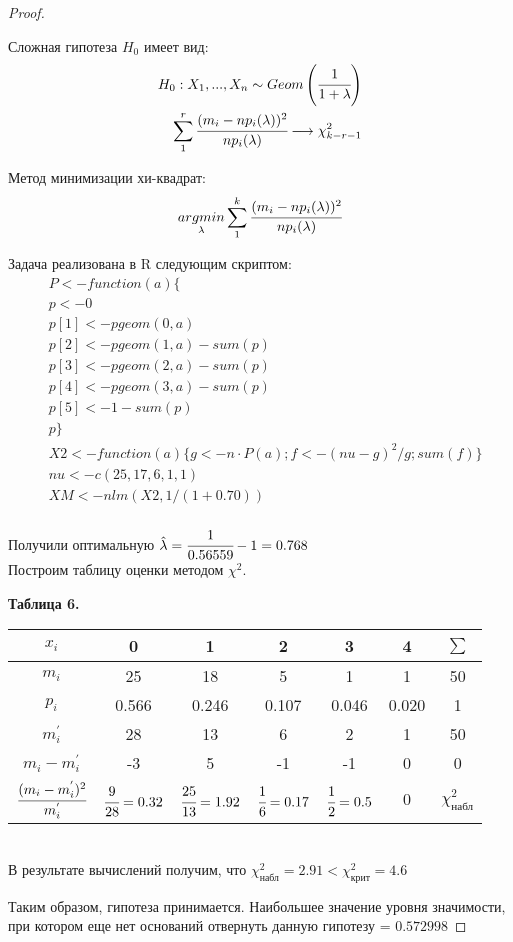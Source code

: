 \begin{proof}
	$ $
	
	Сложная гипотеза $H_0$ имеет вид:
	\begin{align}
		H_0: X_1, ..., X_n \sim Geom\left(\cfrac{1}{1+\lambda}\right) \\
		\sum\limits_1^r\cfrac{(m_i-np_i(\lambda))^2}{np_i(\lambda)}\longrightarrow\chi^2_{k-r-1}
	\end{align}	
	
	Метод минимизации хи-квадрат:
	\begin{equation}
		\underset{\lambda}{argmin}\sum\limits_1^k\cfrac{(m_i-np_i(\lambda))^2}{np_i(\lambda)}
	\end{equation}
	
	Задача реализована в R следующим скриптом:
	\begin{align}
		&P <- function(a)\{ \\
		&p <- 0\\
		&p[1] <- pgeom(0, a)\\
		&p[2] <- pgeom(1, a) - sum(p)\\
		&p[3] <- pgeom(2, a) - sum(p)\\
		&p[4] <- pgeom(3, a) - sum(p)\\
		&p[5] <- 1-sum(p)\\
		&p\}\\
		&X2 <- function(a)\{g <- n\cdot P(a); f <- (nu-g)^2/g; sum(f)\} \\
		&nu <- c(25, 17, 6, 1, 1) \\
		&XM <- nlm(X2, 1/(1+0.70))\\
	\end{align}
	
	Получили оптимальную $\hat{\lambda}=\cfrac1{0.56559}-1=0.768$ \\
	
	Построим таблицу оценки методом $\chi^2$. 
		
	\textbf{Таблица 6.} \\
	
	\begin{tabular}{|c|c|c|c|c|c|c|}
		\hline
		$x_i$ & 0 & 1 & 2 & 3 & 4 & $\sum$ \\ \hline 
		$m_i$ & 25 & 18 & 5 & 1 & 1 & 50 \\ \hline 
		$p_i$ & 0.566 & 0.246 & 0.107 & 0.046 & 0.020 & 1 \\ \hline 
		$m_i^{'}$ & 28 & 13 & 6 & 2 & 1 & 50 \\ \hline 
		$m_i-m_i^{'}$ & -3 & 5 & -1 & -1 & 0 & 0 \\ \hline 
		$\cfrac{(m_i-m_i^{'})^2}{m_i^{'}}$ & $\cfrac{9}{28}=0.32$ & $\cfrac{25}{13}=1.92$ & $\cfrac{1}{6}=0.17$ & $\cfrac12=0.5$ & $0$ & $\chi^2_{\text{набл}}$ \\
		\hline
	\end{tabular} \\

	В результате вычислений получим, что $\chi^2_{\text{набл}}=2.91<\chi^2_{\text{крит}}=4.6$ 
	 
	Таким образом, гипотеза принимается. Наибольшее значение уровня значимости, при котором еще нет оснований отвернуть данную гипотезу = $0.572998$	
\end{proof}

\newpage



